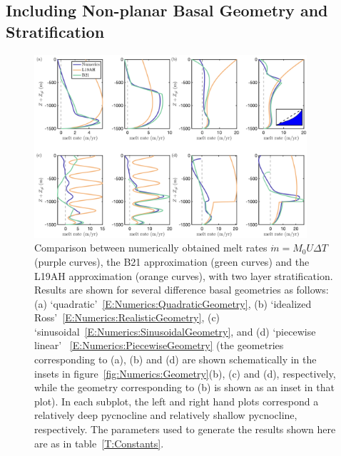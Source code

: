 \documentclass[openacc]{rsproca_new}%
\begin{document}
\subsection{Including Non-planar Basal Geometry and Stratification}
\begin{figure}
\centering
\includegraphics[width = 0.9\textwidth]{Submitted_PRSA/make_plots/plots/figure8.png}
\caption{Comparison between numerically obtained melt rates $\dot{m}= M_0 U \Delta T$ (purple curves), the B21 approximation (green curves) and the L19AH approximation (orange curves), with two layer stratification. Results are shown for several difference basal geometries as follows: (a) `quadratic'~\eqref{E:Numerics:QuadraticGeometry}, (b) `idealized Ross'~\eqref{E:Numerics:RealisticGeometry}, (c) `sinusoidal~\eqref{E:Numerics:SinusoidalGeometry}, and (d) `piecewise linear' ~\eqref{E:Numerics:PiecewiseGeometry} (the geometries corresponding to (a), (b) and (d) are shown schematically in the insets in figure~\ref{fig:Numerics:Geometry}(b), (c) and (d), respectively, while the geometry corresponding to (b) is shown as an inset in that plot). In each subplot, the left and right hand plots correspond a relatively deep pycnocline and relatively shallow pycnocline, respectively.  The parameters used to generate the results shown here are as in table~\ref{T:Constants}. }\label{fig:Numerics:pycnocline_and_geometry_idealized}
\end{figure}
\end{document}

